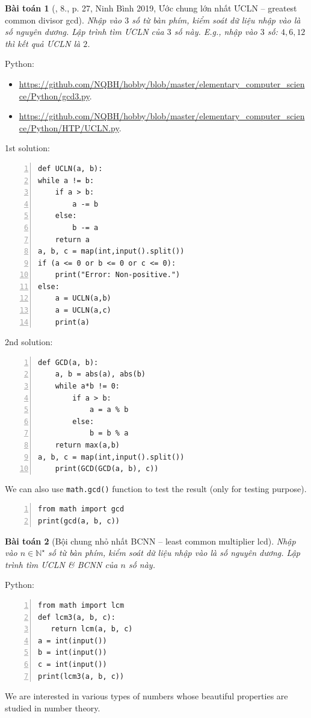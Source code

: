 \documentclass{article}
\newtheorem{baitoan}{Bài toán}
\begin{document}
\begin{baitoan}[\cite{VietSTEM2021}, 8., p. 27, Ninh Bình 2019, Ước chung lớn nhất ƯCLN -- greatest common divisor gcd]
	Nhập vào $3$ số từ bàn phím, kiểm soát dữ liệu nhập vào là số nguyên dương. Lập trình tìm \emph{ƯCLN} của $3$ số này. E.g., nhập vào $3$ số: $4,6,12$ thì kết quả \emph{ƯCLN} là $2$.
\end{baitoan}
Python:
\begin{itemize}
	\item \url{https://github.com/NQBH/hobby/blob/master/elementary_computer_science/Python/gcd3.py}.
	\item \url{https://github.com/NQBH/hobby/blob/master/elementary_computer_science/Python/HTP/UCLN.py}.
\end{itemize}
\newpage
\begin{multicols}{2}
	1st solution:
\begin{Verbatim}[numbers=left,xleftmargin=5mm]
def UCLN(a, b):
while a != b:
    if a > b:
        a -= b
    else:
        b -= a
    return a
a, b, c = map(int,input().split())
if (a <= 0 or b <= 0 or c <= 0):
    print("Error: Non-positive.")
else:
    a = UCLN(a,b)
    a = UCLN(a,c)
    print(a)
\end{Verbatim}
\columnbreak
	2nd solution:
\begin{Verbatim}[numbers=left,xleftmargin=5mm]
def GCD(a, b):
    a, b = abs(a), abs(b)
    while a*b != 0:
        if a > b:
            a = a % b
        else:
            b = b % a
    return max(a,b)
a, b, c = map(int,input().split())
	print(GCD(GCD(a, b), c))
\end{Verbatim}
\end{multicols}
We can also use \texttt{math.gcd()} function to test the result (only for testing purpose).
\begin{Verbatim}[numbers=left,xleftmargin=5mm]
from math import gcd
print(gcd(a, b, c))
\end{Verbatim}

\begin{baitoan}[Bội chung nhỏ nhất BCNN -- least common multiplier lcd]
	Nhập vào $n\in\mathbb{N}^\star$ số từ bàn phím, kiểm soát dữ liệu nhập vào là số nguyên dương. Lập trình tìm \emph{ƯCLN} \& \emph{BCNN} của $n$ số này.
\end{baitoan}
Python:
\begin{Verbatim}[numbers=left,xleftmargin=5mm]
from math import lcm
def lcm3(a, b, c):
   return lcm(a, b, c)
a = int(input())
b = int(input())
c = int(input())
print(lcm3(a, b, c))
\end{Verbatim}
We are interested in various types of numbers whose beautiful properties are studied in number theory.
\end{document}
